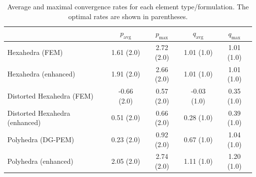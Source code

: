 
\begin{table}[!ht]
  \begin{center}
    \begin{tabular}{| l || c | c || c | c |}
    \hline
           & $p_{\text{avg}}$ & $p_{\text{max}}$ & $q_{\text{avg}}$ & $q_{\text{max}}$ \\ \hline \hline
    Hexahedra (FEM)                & 1.61 (2.0) & 2.72 (2.0) & 1.01 (1.0) & 1.01 (1.0) \\ \hline
    Hexahedra (enhanced)           & 1.91 (2.0) & 2.66 (2.0) & 1.01 (1.0) & 1.01 (1.0) \\ \hline
    Distorted Hexahedra (FEM)      & -0.66 (2.0) & 0.57 (2.0) & -0.03 (1.0) & 0.35 (1.0) \\ \hline
    Distorted Hexahedra (enhanced) & 0.51 (2.0) & 0.66 (2.0) & 0.28 (1.0) & 0.39 (1.0) \\ \hline
    Polyhedra (DG-PEM)             & 0.23 (2.0) & 0.92 (2.0) & 0.67 (1.0) & 1.04 (1.0) \\ \hline
    Polyhedra (enhanced)           & 2.05 (2.0) & 2.74 (2.0) & 1.11 (1.0) & 1.20 (1.0) \\
    \hline
    \end{tabular}
    \caption{Average and maximal convergence rates for each element type/formulation. The optimal rates are shown in parentheses.}
    \vspace{-5pt}
    \label{tab:twisting_annulus_convergence_rates}
    \vspace{-10pt}
  \end{center}
\end{table}

